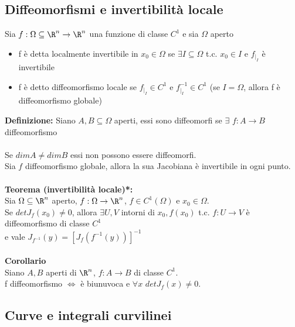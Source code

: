 \documentclass{article}
\begin{document}
\subsection{Diffeomorfismi e invertibilità locale}
Sia $f:\Omega\subseteq\R^n\rightarrow\R^n$ una funzione di classe $C^1$ e sia $\Omega$ aperto
\begin{itemize}
    \item f è detta localmente invertibile in $x_0\in\Omega$ se $\exists I\subseteq\Omega$ t.c. $x_0\in I$ e $f_{|_I}$ è invertibile
    \item f è detto diffeomorfismo locale se $f_{|_I}\in C^1$ e $f_{|_I}^{-1}\in C^1$ (se $I=\Omega$, allora f è diffeomorfismo globale)
\end{itemize}
\textbf{Definizione:} Siano $A,B\subseteq\Omega$ aperti, essi sono diffeomorfi se $\exists$ $f:A\rightarrow B$ diffeomorfismo\\\\
Se $dim A\neq dim B$ essi non possono essere diffeomorfi.\\
Sia $f$ diffeomorfismo globale, allora la sua Jacobiana è invertibile in ogni punto.\\\\
\textbf{Teorema (invertibilità locale)*:}\\
Sia $\Omega\subseteq\R^n$ aperto, $f:\Omega\rightarrow\R^n$, $f\in C^1(\Omega)$ e $x_0\in\Omega$.\\
Se $det J_f(x_0)\neq0$, allora $\exists U,V$ intorni di $x_0,f(x_0)$ t.c. $f:U\rightarrow V$ è diffeomorfismo di classe $C^1$\\ e vale $J_{f^{-1}}(y)=[J_f(f^{-1}(y))]^{-1}$\\\\
\textbf{Corollario}\\
Siano $A,B$ aperti di $\R^n$, $f:A\rightarrow B$ di classe $C^1$.\\
f diffeomorfismo $\Leftrightarrow$ è biunuvoca e $\forall x$ $det J_f(x)\neq0$.




\subsection{Curve e integrali curvilinei}
\end{document}
